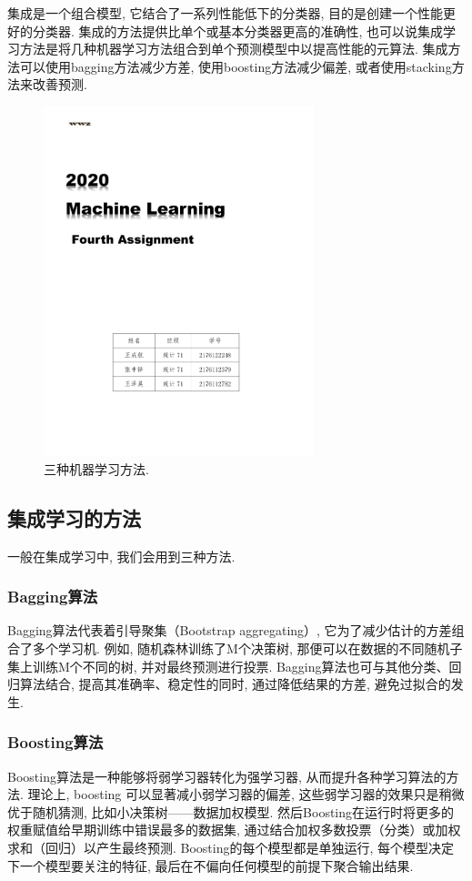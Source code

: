 \documentclass[lang=cn,11pt]{elegantpaper}
\begin{document}
集成是一个组合模型, 它结合了一系列性能低下的分类器, 目的是创建一个性能更好的分类器. 集成的方法提供比单个或基本分类器更高的准确性, 也可以说集成学习方法是将几种机器学习方法组合到单个预测模型中以提高性能的元算法. 集成方法可以使用bagging方法减少方差, 使用boosting方法减少偏差, 或者使用stacking方法来改善预测. 
\begin{figure}[htbp]
  \centering
  \includegraphics[width=0.7\textwidth]{1}
  \caption{三种机器学习方法.}
\end{figure}
\subsection{集成学习的方法}
一般在集成学习中, 我们会用到三种方法. 
\subsubsection*{Bagging算法}
Bagging算法代表着引导聚集（Bootstrap aggregating）, 它为了减少估计的方差组合了多个学习机. 例如, 随机森林训练了M个决策树, 那便可以在数据的不同随机子集上训练M个不同的树, 并对最终预测进行投票. Bagging算法也可与其他分类、回归算法结合, 提高其准确率、稳定性的同时, 通过降低结果的方差, 避免过拟合的发生. 
\subsubsection*{Boosting算法}
Boosting算法是一种能够将弱学习器转化为强学习器, 从而提升各种学习算法的方法. 理论上, boosting 可以显著减小弱学习器的偏差, 这些弱学习器的效果只是稍微优于随机猜测, 比如小决策树——数据加权模型. 然后Boosting在运行时将更多的权重赋值给早期训练中错误最多的数据集, 通过结合加权多数投票（分类）或加权求和（回归）以产生最终预测. Boosting的每个模型都是单独运行, 每个模型决定下一个模型要关注的特征, 最后在不偏向任何模型的前提下聚合输出结果. 
\end{document}
